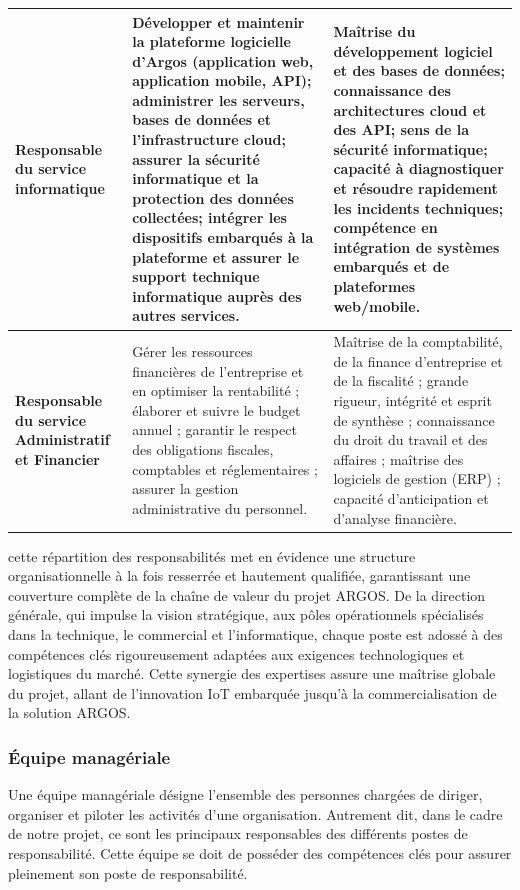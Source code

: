 \begin{table}[htbp]
\begin{tabularx}{\textwidth}{|>{\raggedright\arraybackslash}p{3cm}|X|X|}
        \hline
        \textbf{Responsable du service informatique} & Développer et maintenir la plateforme logicielle d'Argos (application web, application mobile, API); administrer les serveurs, bases de données et l'infrastructure cloud; assurer la sécurité informatique et la protection des données collectées; intégrer les dispositifs embarqués à la plateforme et assurer le support technique informatique auprès des autres services. & Maîtrise du développement logiciel et des bases de données; connaissance des architectures cloud et des API; sens de la sécurité informatique; capacité à diagnostiquer et résoudre rapidement les incidents techniques; compétence en intégration de systèmes embarqués et de plateformes web/mobile. \\
        \hline
        \textbf{Responsable du service Administratif et Financier} & Gérer les ressources financières de l'entreprise et en optimiser la rentabilité ; élaborer et suivre le budget annuel ; garantir le respect des obligations fiscales, comptables et réglementaires ; assurer la gestion administrative du personnel. & Maîtrise de la comptabilité, de la finance d'entreprise et de la fiscalité ; grande rigueur, intégrité et esprit de synthèse ; connaissance du droit du travail et des affaires ; maîtrise des logiciels de gestion (ERP) ; capacité d'anticipation et d'analyse financière. \\
        \hline
    \end{tabularx}
  \tablesourcepromoteurs
\end{table}

\noindent cette répartition des responsabilités met en évidence une structure organisationnelle à la fois resserrée et hautement qualifiée, garantissant une couverture complète de la chaîne de valeur du projet ARGOS. De la direction générale, qui impulse la vision stratégique, aux pôles opérationnels spécialisés dans la technique, le commercial et l'informatique, chaque poste est adossé à des compétences clés rigoureusement adaptées aux exigences technologiques et logistiques du marché. Cette synergie des expertises assure une maîtrise globale du projet, allant de l'innovation IoT embarquée jusqu'à la commercialisation de la solution ARGOS.

\subsubsection{Équipe managériale}

Une équipe managériale désigne l'ensemble des personnes chargées de diriger, organiser et piloter les activités d'une organisation. Autrement dit, dans le cadre de notre projet, ce sont les principaux responsables des différents postes de responsabilité. Cette équipe se doit de posséder des compétences clés pour assurer pleinement son poste de responsabilité.

